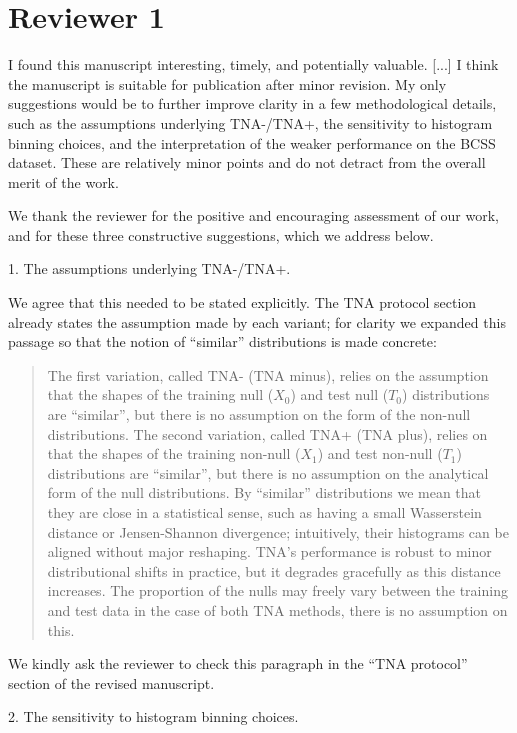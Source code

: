 \documentclass{article}
\newcommand{\response}[1]{\vspace*{1ex} \color{blue} \noindent #1 \color{black}
\vspace*{2ex}}
\newcommand{\edit}[1]{\begin{quotation}\color{red}\noindent #1
\color{black}\end{quotation}}
\begin{document}
\clearpage
\section*{Reviewer 1}

I found this manuscript interesting, timely, and potentially valuable. [...] I think the manuscript is suitable for publication after minor revision. My only suggestions would be to further improve clarity in a few methodological details, such as the assumptions underlying TNA-/TNA+, the sensitivity to histogram binning choices, and the interpretation of the weaker performance on the BCSS dataset. These are relatively minor points and do not detract from the overall merit of the work.

\response{We thank the reviewer for the positive and encouraging assessment of our work, and for these three constructive suggestions, which we address below.}

1. The assumptions underlying TNA-/TNA+.

\response{We agree that this needed to be stated explicitly. The TNA protocol section already states the assumption made by each variant; for clarity we expanded this passage so that the notion of ``similar'' distributions is made concrete:}

\edit{The first variation, called TNA- (TNA minus), relies on the assumption that the shapes of the training null ($X_0$) and test null ($T_0$) distributions are ``similar'', but there is no assumption on the form of the non-null distributions. The second variation, called TNA+ (TNA plus), relies on that the shapes of the training non-null ($X_1$) and test non-null ($T_1$) distributions are ``similar'', but there is no assumption on the analytical form of the null distributions. By ``similar'' distributions we mean that they are close in a statistical sense, such as having a small Wasserstein distance or Jensen-Shannon divergence; intuitively, their histograms can be aligned without major reshaping. TNA's performance is robust to minor distributional shifts in practice, but it degrades gracefully as this distance increases. The proportion of the nulls may freely vary between the training and test data in the case of both TNA methods, there is no assumption on this.}

\response{We kindly ask the reviewer to check this paragraph in the ``TNA protocol'' section of the revised manuscript.}

2. The sensitivity to histogram binning choices.
\end{document}
